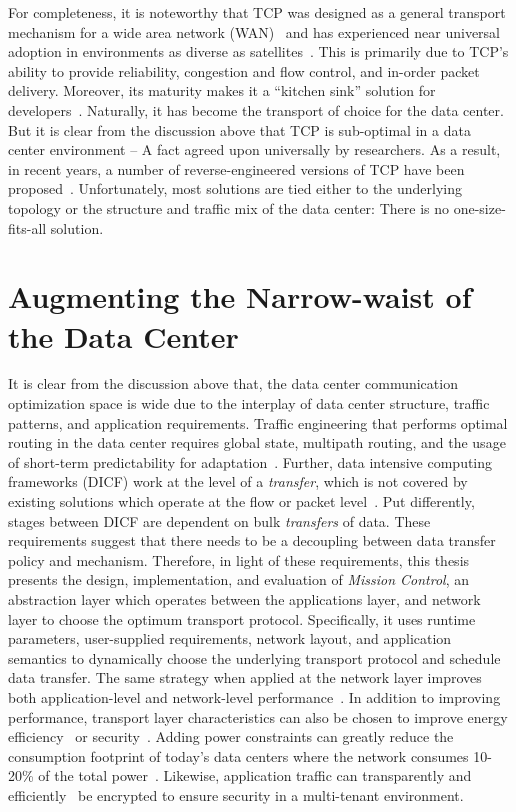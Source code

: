 \documentclass[a4paper,12pt,twoside,openright]{report}
\begin{document}
For completeness, it is noteworthy that TCP was designed as a general transport
mechanism for a wide area network (WAN)~\cite{Clark:1988:DPD} and has
experienced near universal adoption in environments as diverse as
satellites~\cite{Henderson:1999:TPF}.
This is primarily due to TCP's ability to provide reliability, congestion and
flow control, and in-order packet delivery.
Moreover, its maturity makes it a ``kitchen sink'' solution for
developers~\cite{Vasudevan:2009:SEF}. Naturally, it has become the transport of
choice for the data center. But it is clear from the discussion above that TCP
is sub-optimal in a data center environment -- A fact agreed upon universally by
researchers. As a result, in recent years, a number of reverse-engineered
versions of TCP have been
proposed~\cite{Alizadeh:2010:DCT,Wu:2010:IIC,Wilson:2011:BNL,Vasudevan:2009:SEF,Chen:2009:UTI}.
Unfortunately, most solutions are tied either to the underlying topology or the
structure and traffic mix of the data center: There is no one-size-fits-all
solution.

\section{Augmenting the Narrow-waist of the Data Center}
It is clear from the discussion above that, the data center communication
optimization space is wide due to the interplay of data center structure,
traffic patterns, and application requirements. Traffic engineering that
performs optimal routing in the data center requires global state, multipath
routing, and the usage of short-term predictability for
adaptation~\cite{Benson:2010:CFT,Benson:2011:MFG}. Further, data intensive
computing frameworks (DICF) work at the level of a \emph{transfer}, which is not
covered by existing solutions which operate at the flow or packet
level~\cite{Chowdhury:2011:MDT}.
Put differently, stages between DICF are dependent on bulk \emph{transfers} of
data. These requirements suggest that there needs to be a decoupling between
data transfer policy and mechanism. Therefore, in light of these requirements,
this thesis presents the design, implementation, and evaluation of \emph{Mission
Control}, an abstraction layer which operates between the applications layer,
and network layer to choose the optimum transport protocol. Specifically, it
uses runtime parameters, user-supplied requirements, network layout, and
application semantics to dynamically choose the underlying transport protocol
and schedule data transfer. The same strategy when applied at the network layer
improves both application-level and network-level
performance~\cite{Abu-Libdeh:2010:SRF}. In addition to improving performance,
transport layer characteristics can also be chosen to improve energy
efficiency~\cite{Heller:2010:ESE} or security~\cite{bittau:the}. Adding power
constraints can greatly reduce the consumption footprint of today's data centers
where the network consumes 10-20\% of the total power~\cite{Greenberg:2008:CCR}.
Likewise, application traffic can transparently and
efficiently~\cite{bittau:the} be encrypted to ensure security in a multi-tenant
environment.
\end{document}
